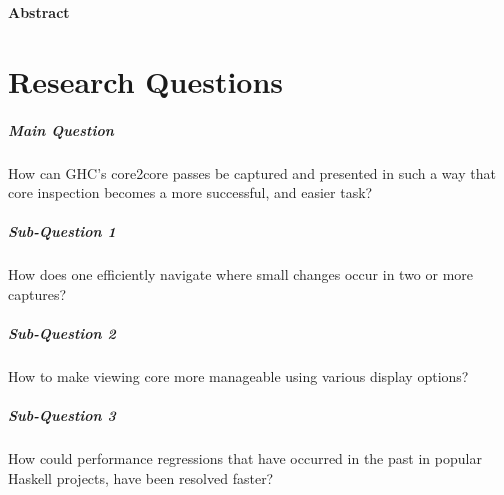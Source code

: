 \documentclass{report}
\begin{document}
\vspace*{\fill}
\begin{center}
\begin{minipage}{.7\textwidth}
\centerline{\textbf{Abstract}}

\end{minipage}
\end{center}
\vfill %

\thispagestyle{empty}

\newpage
\clearpage
{}
\tableofcontents

\newpage
\clearpage
{}

\newpage



\chapter{Research Questions}


\paragraph{Main Question} 
How can GHC’s core2core passes be captured and presented in such a way that core
inspection becomes a more successful, and easier task?

\hfill \break

\paragraph{Sub-Question 1} 
How does one efficiently navigate where small changes occur in two or more captures?

\paragraph{Sub-Question 2}
How to make viewing core more manageable using various display options?

\paragraph{Sub-Question 3}
How could performance regressions that have occurred in the past in popular Haskell projects,
have been resolved faster?


\newpage



\newpage



\newpage


\newpage





\appendix
\clearpage
{}
\end{document}
